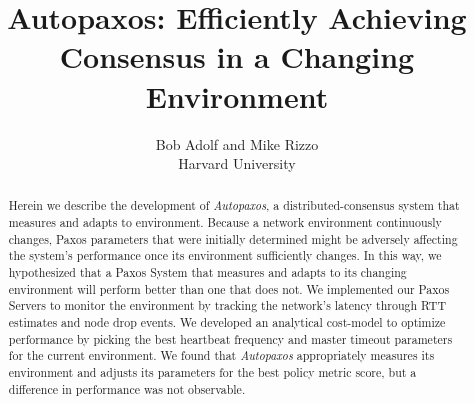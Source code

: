 \documentclass[pageno]{jpaper}
\title{Autopaxos: Efficiently Achieving Consensus in a Changing Environment}
\author{Bob Adolf and Mike Rizzo\\Harvard University}
\date{}
\begin{document}
\maketitle

\begin{abstract}
Herein we describe the development of \emph{Autopaxos}, a distributed-consensus system that measures and adapts to environment.  Because a network environment continuously changes, Paxos parameters that were initially determined might be adversely affecting the system's performance once its environment sufficiently changes.  In this way, we hypothesized that a Paxos System that measures and adapts to its changing environment will perform better than one that does not.  We implemented our Paxos Servers to monitor the environment by tracking the network's latency through RTT estimates and node drop events.  We developed an analytical cost-model to optimize performance by picking the best heartbeat frequency and master timeout parameters for the current environment.  We found that \emph{Autopaxos} appropriately measures its environment and adjusts its parameters for the best policy metric score, but a difference in performance was not observable.
\end{abstract}





%




\end{document}
